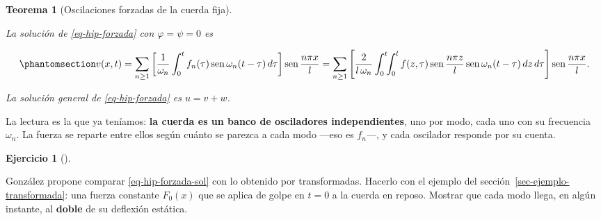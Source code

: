\documentclass[
  spanish,
  a4paper,
]{scrbook}
\theoremstyle{definition}
\theoremstyle{plain}
\theoremstyle{definition}
\theoremstyle{plain}
\newtheorem{theorem}{Teorema}[chapter]
\theoremstyle{definition}
\newtheorem{exercise}{Ejercicio}[chapter]
\theoremstyle{remark}
\begin{document}
\begin{theorem}[Oscilaciones forzadas de la cuerda
fija]\protect\hypertarget{thm-hip-forzada}{}\label{thm-hip-forzada}

La solución de \ref{eq-hip-forzada} con \(\varphi = \psi = 0\) es

\begin{equation}\protect\phantomsection\label{eq-hip-forzada-sol}{
v(x,t) = \sum_{n\ge1}\left[\frac{1}{\omega_n}\int_0^t f_n(\tau)\operatorname{sen}\omega_n(t-\tau)\,d\tau\right]\operatorname{sen}\frac{n\pi x}{l}
= \sum_{n\ge1}\left[\frac{2}{l\,\omega_n}\int_0^t\!\!\int_0^l f(z,\tau)\operatorname{sen}\frac{n\pi z}{l}\operatorname{sen}\omega_n(t-\tau)\,dz\,d\tau\right]\operatorname{sen}\frac{n\pi x}{l}.
}\end{equation}

La solución general de \ref{eq-hip-forzada} es \(u = v + w\).

\end{theorem}

La lectura es la que ya teníamos: \textbf{la cuerda es un banco de
osciladores independientes}, uno por modo, cada uno con su frecuencia
\(\omega_n\). La fuerza se reparte entre ellos según cuánto se parezca a
cada modo ---eso es \(f_n\)---, y cada oscilador responde por su cuenta.

\begin{exercise}[]\protect\hypertarget{exr-hip-comparar-transformada}{}\label{exr-hip-comparar-transformada}

González propone comparar \ref{eq-hip-forzada-sol} con lo obtenido por
transformadas. Hacerlo con el ejemplo del
sección~\ref{sec-ejemplo-transformada}: una fuerza constante \(F_0(x)\)
que se aplica de golpe en \(t=0\) a la cuerda en reposo. Mostrar que
cada modo llega, en algún instante, al \textbf{doble} de su deflexión
estática.

\end{exercise}
\end{document}
